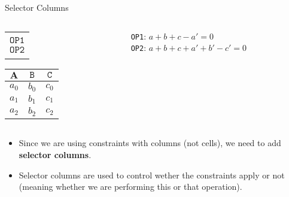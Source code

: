 \begin{frame}{Selector Columns}
\begin{columns}
\begin{column}{0.48\textwidth}
\begin{table}[h!]
\begin{tabular}{c}
$             $ \\
$\mathtt{OP1}$ \\
$\mathtt{OP2}$ \\
$             $
\end{tabular}
\begin{tabular}{|c|c|c|}\hline
$\mathbf{A}$ & $\mathtt{B}$ & $\mathtt{C}$ \\ \hline
$a_0$ & $b_0$ & $c_0$ \\ \hline
$a_1$ & $b_1$ & $c_1$ \\ \hline
$a_2$ & $b_2$ & $c_2$ \\ \hline
\end{tabular}
\end{table}
\end{column}
\begin{column}{0.48\textwidth}
\texttt{OP1}: $a+b+c-a'=0$
\\ \texttt{OP2}: $a+b+c+a'+b'-c'=0$
\end{column}
\end{columns}


\begin{itemize}
\small
\item Since we are using constraints with columns (not cells), we need to add \textbf{selector columns}.
\item Selector columns are used to control wether the constraints apply or not (meaning whether we are performing this or that operation).
\end{itemize}


\end{frame}
